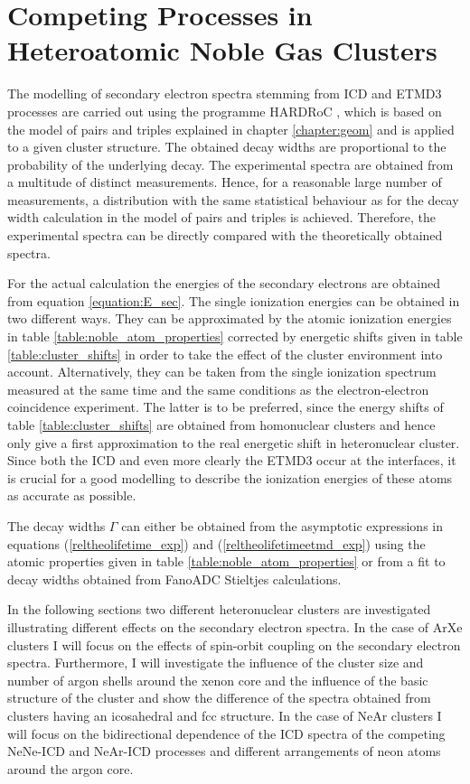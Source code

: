 \chapter[Heteroatomic Noble Gas Clusters]{Competing Processes in Heteroatomic Noble Gas Clusters}
\label{chapter_clusters}

The modelling of secondary electron spectra stemming from \ac{ICD}
and \ac{ETMD}3 processes are carried out using the programme
HARDRoC \cite{HARDRoC}, which is based on the model of pairs and
triples explained in chapter \ref{chapter:geom} and is applied
to a given cluster structure. The obtained
decay widths are proportional to the probability of the underlying decay.
The experimental spectra are obtained from a multitude of distinct measurements.
Hence, for a reasonable large number of measurements, a distribution with the
same statistical behaviour as for the decay width calculation in the
model of pairs and triples is achieved. Therefore, the experimental spectra
can be directly compared with the theoretically obtained spectra.

For the actual calculation the energies of the secondary electrons are obtained
from equation \ref{equation:E_sec}. The single ionization energies
can be obtained in two different ways. They can be
approximated by the atomic ionization energies in table
\ref{table:noble_atom_properties} corrected by energetic shifts
given in table \ref{table:cluster_shifts} in order to take
the effect of the cluster environment into account. 
Alternatively, they can be taken from the single ionization spectrum
measured at the same time and the same conditions as the electron-electron
coincidence experiment. The latter is to be preferred, since the energy shifts
of table \ref{table:cluster_shifts} are obtained from homonuclear clusters and
hence only give a first approximation to the real energetic shift in
heteronuclear cluster. Since both the \ac{ICD} and even more clearly the
\ac{ETMD}3 occur at the interfaces, it is crucial for a good modelling to
describe the ionization energies of these atoms as accurate as possible.

The decay widths $\Gamma$ can either be obtained from the asymptotic expressions
in equations (\ref{reltheolifetime_exp}) and (\ref{reltheolifetimeetmd_exp})
using the atomic properties given in table \ref{table:noble_atom_properties}
or from a fit to decay widths obtained from FanoADC Stieltjes calculations.

In the following sections two different heteronuclear clusters are investigated
illustrating different effects on the secondary electron spectra.
In the case of ArXe clusters I will focus on the effects of spin-orbit coupling
on the secondary electron spectra. Furthermore, I will investigate the influence
of the cluster size and number of argon shells around the xenon core and
the influence of the basic structure of the cluster and show the
difference of the spectra
obtained from clusters having an icosahedral
and \ac{fcc} structure.
In the case of NeAr clusters I will focus on the bidirectional dependence of
the ICD spectra of the competing NeNe-ICD and NeAr-ICD processes and
different arrangements of neon atoms around the argon core.

\newpage

\newpage


